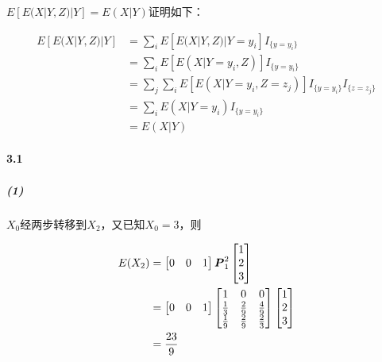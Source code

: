 \documentclass{article}
\begin{document}
    $E[E(X|Y, Z)|Y] = E(X|Y)$证明如下：

    \begin{equation}
        \begin{aligned}
            E[E(X|Y, Z)|Y] &= \sum_i E[E(X|Y, Z)|Y=y_i]I_{\{y=y_i\}} \\
            &= \sum_i E[E(X|Y=y_i, Z)]I_{\{y=y_i\}} \\
            &= \sum_j \sum_i E[E(X|Y=y_i, Z=z_j)]I_{\{y=y_i\}}I_{\{z=z_j\}} \\
            &= \sum_i E(X|Y=y_i)I_{\{y=y_i\}} \\
            &= E(X|Y)
        \end{aligned}
    \end{equation}

    \paragraph*{3.1}

    \subparagraph*{(1)} $X_0$经两步转移到$X_2$，又已知$X_0 = 3$，则

    \begin{equation}
        \begin{aligned}
            E(X_2) & = \begin{bmatrix}
                0 & 0 & 1
            \end{bmatrix}\boldsymbol{P}_1^2 \begin{bmatrix}
                1 \\ 2 \\ 3
            \end{bmatrix} \\
            &=\begin{bmatrix}
                0 & 0 & 1
            \end{bmatrix}\begin{bmatrix}
                1 & 0 & 0 \\
                \frac 13 & \frac 29 & \frac 49 \\
                \frac 19 & \frac 29 & \frac 23 \\
            \end{bmatrix} \begin{bmatrix}
                1 \\ 2 \\ 3
            \end{bmatrix} \\
            &= \frac{23}{9}
        \end{aligned}
    \end{equation}
\end{document}
